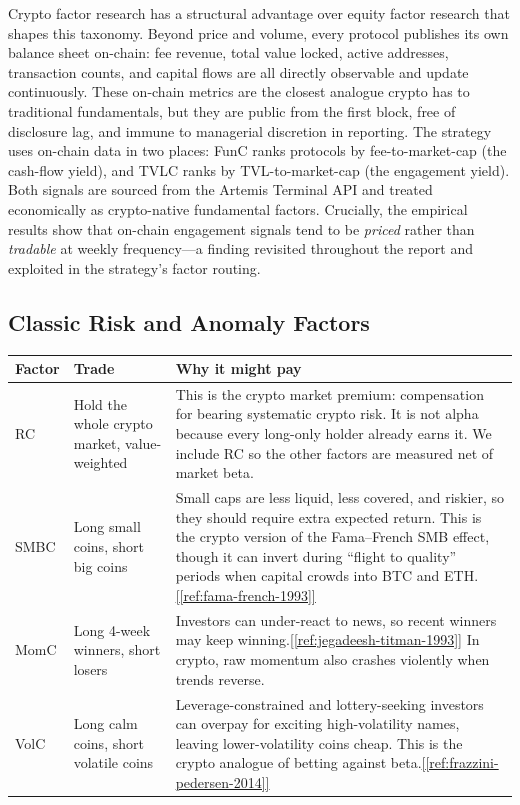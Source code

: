 \documentclass[11pt,a4paper]{article}
\newcommand{\ieeecite}[1]{\hyperref[ref:#1]{[\ref*{ref:#1}]}}
\begin{document}
Crypto factor research has a structural advantage over equity factor research that shapes this taxonomy. Beyond price and volume, every protocol publishes its own balance sheet on-chain: fee revenue, total value locked, active addresses, transaction counts, and capital flows are all directly observable and update continuously. These on-chain metrics are the closest analogue crypto has to traditional fundamentals, but they are public from the first block, free of disclosure lag, and immune to managerial discretion in reporting. The strategy uses on-chain data in two places: FunC ranks protocols by fee-to-market-cap (the cash-flow yield), and TVLC ranks by TVL-to-market-cap (the engagement yield). Both signals are sourced from the Artemis Terminal API and treated economically as crypto-native fundamental factors. Crucially, the empirical results show that on-chain engagement signals tend to be \emph{priced} rather than \emph{tradable} at weekly frequency---a finding revisited throughout the report and exploited in the strategy's factor routing.

\subsection{Classic Risk and Anomaly Factors}

\begin{center}
\small
\begin{tabularx}{\textwidth}{L{0.14\textwidth}L{0.25\textwidth}X}
\toprule
{}
\textbf{Factor} & \textbf{Trade} & \textbf{Why it might pay} \\
\midrule
RC & Hold the whole crypto market, value-weighted & This is the crypto market premium: compensation for bearing systematic crypto risk. It is not alpha because every long-only holder already earns it. We include RC so the other factors are measured net of market beta. \\
SMBC & Long small coins, short big coins & Small caps are less liquid, less covered, and riskier, so they should require extra expected return. This is the crypto version of the Fama--French SMB effect, though it can invert during ``flight to quality'' periods when capital crowds into BTC and ETH.\ieeecite{fama-french-1993} \\
MomC & Long 4-week winners, short losers & Investors can under-react to news, so recent winners may keep winning.\ieeecite{jegadeesh-titman-1993} In crypto, raw momentum also crashes violently when trends reverse. \\
VolC & Long calm coins, short volatile coins & Leverage-constrained and lottery-seeking investors can overpay for exciting high-volatility names, leaving lower-volatility coins cheap. This is the crypto analogue of betting against beta.\ieeecite{frazzini-pedersen-2014} \\
\bottomrule
\end{tabularx}
\end{center}
\end{document}
